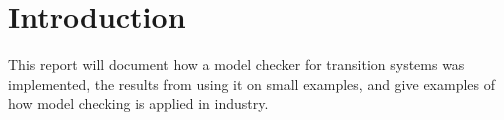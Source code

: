 \section{Introduction}
This report will document how a model checker for transition systems was implemented, the results from using it on small examples, and give examples of how model checking is applied in industry. \\